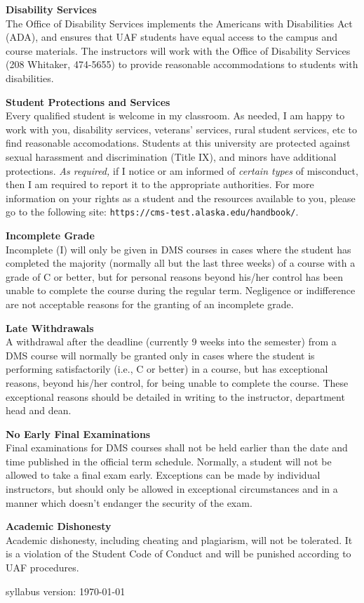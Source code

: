 \documentclass[12pt]{article}
\renewcommand{\emph}[1]{\textsf{\textbf{#1}}}
\newcommand{\localhead}[1]{\par\smallskip\textbf{#1}\nobreak\\}%
\def\subheading#1{\localhead{\emph{#1}}}
\begin{document}
\subheading{Disability Services}
The Office of Disability Services implements the
Americans with Disabilities Act (ADA), and ensures that UAF students
have equal access to the campus and course materials. The instructors will work with
the Office of Disability Services (208 Whitaker, 474-5655) to provide
reasonable accommodations to students with disabilities.

\subheading{Student Protections and Services}
Every qualified student is welcome in my classroom.  As needed, I am happy to
work with you, disability services, veterans' services, rural student services,
etc to find reasonable accomodations. Students at this university are protected
against sexual harassment and discrimination (Title IX), and minors have
additional protections. \textit{As required,} if I notice or am informed
of \textit{certain types} of misconduct, then I am required to report it
to the appropriate authorities.  For more information on your rights as a
student and the resources available to you, please go to the following site:
\texttt{https://cms-test.alaska.edu/handbook/}.

\subheading{Incomplete Grade} 
Incomplete (I) will only be given in
  DMS courses in cases where
  the student has completed the majority (normally all but the last
  three weeks) of a course with a grade of C or better, but for
  personal reasons beyond his/her control has been unable to complete
  the course during the regular term. Negligence or indifference are
  not acceptable reasons for the granting of an incomplete
  grade. 

\subheading{Late Withdrawals} 
A withdrawal after the deadline
  (currently 9 weeks into the semester) from a DMS course will
  normally be granted only in cases where the student is performing
  satisfactorily (i.e., C or better) in a course, but has exceptional
  reasons, beyond his/her control, for being unable to complete the
  course. These exceptional reasons should be detailed in writing to
  the instructor, department head and dean.

\subheading{No Early Final Examinations}
Final examinations for DMS
  courses shall not be held earlier than the date and time published
  in the official term schedule. Normally, a student will not be
  allowed to take a final exam early. Exceptions can be made by
  individual instructors, but should only be allowed in exceptional
  circumstances and in a manner which doesn't endanger the security of
  the exam.

\subheading{Academic Dishonesty}
Academic dishonesty, including cheating and plagiarism, will not
be tolerated.  It is a violation of the Student Code of Conduct
and will be punished according to UAF procedures.

\vfill
\hfill \scriptsize syllabus version: \today \normalsize
\end{document}
